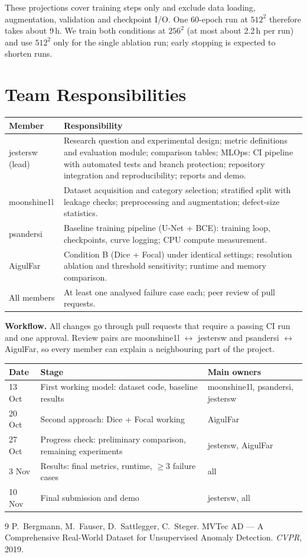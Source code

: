\documentclass[11pt,a4paper]{article}
\newcommand{\teamcontacts}{}
\begin{document}
These projections cover training steps only and exclude data loading, augmentation, validation and checkpoint I/O. One 60-epoch run at $512^2$ therefore takes about 9\,h. We train both conditions at $256^2$ (at most about 2.2\,h per run) and use $512^2$ only for the single ablation run; early stopping is expected to shorten runs.

\section{Team Responsibilities}

\begin{table}[h]
\centering
\small
\begin{tabularx}{\linewidth}{lX}
\toprule
Member & Responsibility \\
\midrule
jestersw (lead) & Research question and experimental design; metric definitions and evaluation module; comparison tables; MLOps: CI pipeline with automated tests and branch protection; repository integration and reproducibility; reports and demo. \\
moonshine1l & Dataset acquisition and category selection; stratified split with leakage checks; preprocessing and augmentation; defect-size statistics. \\
psandersi & Baseline training pipeline (U-Net + BCE): training loop, checkpoints, curve logging; CPU compute measurement. \\
AigulFar & Condition B (Dice + Focal) under identical settings; resolution ablation and threshold sensitivity; runtime and memory comparison. \\
All members & At least one analysed failure case each; peer review of pull requests. \\
\bottomrule
\end{tabularx}
\end{table}

\teamcontacts

\textbf{Workflow.} All changes go through pull requests that require a passing CI run and one approval. Review pairs are moonshine1l $\leftrightarrow$ jestersw and psandersi $\leftrightarrow$ AigulFar, so every member can explain a neighbouring part of the project.

\begin{table}[h]
\centering
\small
\begin{tabularx}{\linewidth}{lXl}
\toprule
Date & Stage & Main owners \\
\midrule
13 Oct & First working model: dataset code, baseline results & moonshine1l, psandersi, jestersw \\
20 Oct & Second approach: Dice + Focal working & AigulFar \\
27 Oct & Progress check: preliminary comparison, remaining experiments & jestersw, AigulFar \\
3 Nov & Results: final metrics, runtime, $\ge 3$ failure cases & all \\
10 Nov & Final submission and demo & jestersw, all \\
\bottomrule
\end{tabularx}
\end{table}

\begin{thebibliography}{9}
 P.~Bergmann, M.~Fauser, D.~Sattlegger, C.~Steger. MVTec AD --- A Comprehensive Real-World Dataset for Unsupervised Anomaly Detection. \emph{CVPR}, 2019.
\end{thebibliography}
\end{document}
